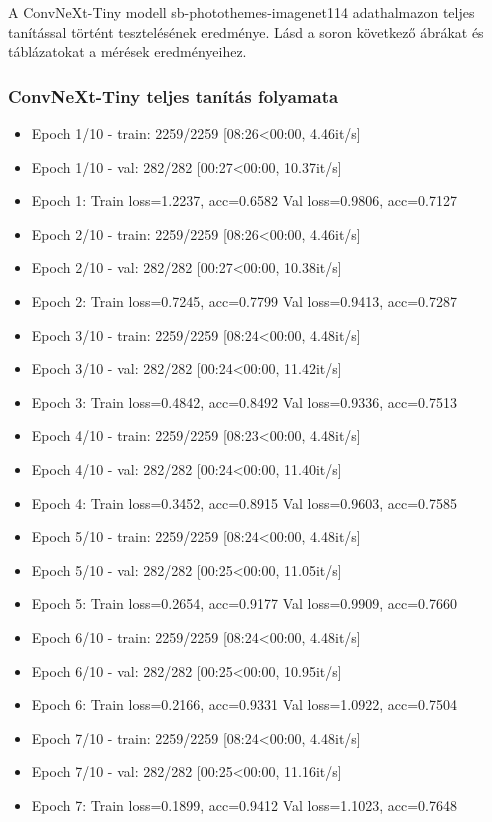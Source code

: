 A ConvNeXt-Tiny modell sb-photothemes-imagenet114 adathalmazon teljes tanítással történt tesztelésének eredménye. Lásd a soron következő ábrákat és táblázatokat a mérések eredményeihez.

\subsubsection{ConvNeXt-Tiny teljes tanítás folyamata}
\begin{itemize} 
	\item Epoch 1/10 - train: 2259/2259 [08:26<00:00,  4.46it/s]
	\item Epoch 1/10 - val: 282/282 [00:27<00:00, 10.37it/s]
	\item Epoch 1: Train loss=1.2237, acc=0.6582 Val loss=0.9806, acc=0.7127
	\item Epoch 2/10 - train: 2259/2259 [08:26<00:00,  4.46it/s]
	\item Epoch 2/10 - val: 282/282 [00:27<00:00, 10.38it/s]
	\item Epoch 2: Train loss=0.7245, acc=0.7799 Val loss=0.9413, acc=0.7287
	\item Epoch 3/10 - train: 2259/2259 [08:24<00:00,  4.48it/s]
	\item Epoch 3/10 - val: 282/282 [00:24<00:00, 11.42it/s]
	\item Epoch 3: Train loss=0.4842, acc=0.8492 Val loss=0.9336, acc=0.7513
	\item Epoch 4/10 - train: 2259/2259 [08:23<00:00,  4.48it/s]
	\item Epoch 4/10 - val: 282/282 [00:24<00:00, 11.40it/s]
	\item Epoch 4: Train loss=0.3452, acc=0.8915 Val loss=0.9603, acc=0.7585
	\item Epoch 5/10 - train: 2259/2259 [08:24<00:00,  4.48it/s]
	\item Epoch 5/10 - val: 282/282 [00:25<00:00, 11.05it/s]
	\item Epoch 5: Train loss=0.2654, acc=0.9177 Val loss=0.9909, acc=0.7660
	\item Epoch 6/10 - train: 2259/2259 [08:24<00:00,  4.48it/s]
	\item Epoch 6/10 - val: 282/282 [00:25<00:00, 10.95it/s]
	\item Epoch 6: Train loss=0.2166, acc=0.9331 Val loss=1.0922, acc=0.7504
	\item Epoch 7/10 - train: 2259/2259 [08:24<00:00,  4.48it/s]
	\item Epoch 7/10 - val: 282/282 [00:25<00:00, 11.16it/s]
	\item Epoch 7: Train loss=0.1899, acc=0.9412 Val loss=1.1023, acc=0.7648

\end{itemize}
